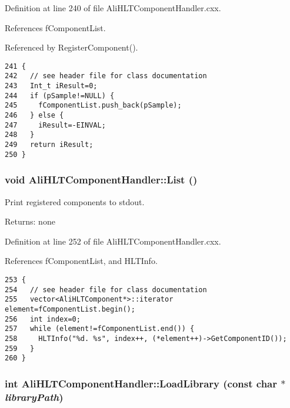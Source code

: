 Definition at line 240 of file Ali\-HLTComponent\-Handler.cxx.

References f\-Component\-List.

Referenced by Register\-Component().

\footnotesize\begin{verbatim}241 {
242   // see header file for class documentation
243   Int_t iResult=0;
244   if (pSample!=NULL) {
245     fComponentList.push_back(pSample);
246   } else {
247     iResult=-EINVAL;
248   }
249   return iResult;
250 }
\end{verbatim}\normalsize 


\subsubsection{\setlength{\rightskip}{0pt plus 5cm}void Ali\-HLTComponent\-Handler::List ()}\label{classAliHLTComponentHandler_a17}


Print registered components to stdout. \begin{Desc}
\item[Returns:]none \end{Desc}


Definition at line 252 of file Ali\-HLTComponent\-Handler.cxx.

References f\-Component\-List, and HLTInfo.

\footnotesize\begin{verbatim}253 {
254   // see header file for class documentation
255   vector<AliHLTComponent*>::iterator element=fComponentList.begin();
256   int index=0;
257   while (element!=fComponentList.end()) {
258     HLTInfo("%d. %s", index++, (*element++)->GetComponentID());
259   }
260 }
\end{verbatim}\normalsize 


\subsubsection{\setlength{\rightskip}{0pt plus 5cm}int Ali\-HLTComponent\-Handler::Load\-Library (const char $\ast$ {\em library\-Path})}\label{classAliHLTComponentHandler_a6}


